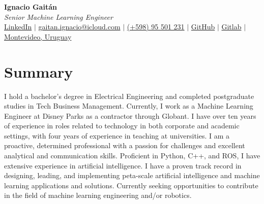 \documentclass[letterpaper,11pt]{article}
\begin{document}
\begin{center}
    \textbf{\LARGE Ignacio Gaitán} \\ \vspace{2ex}
    \textit{Senior Machine Learning Engineer} \\ \vspace{2ex}
    \small
    \faLinkedinSquare \hspace{.5pt} \href{https://www.linkedin.com/in/ignacio-gaitan}{LinkedIn}
    $|$
    \faAt \hspace{.5pt} \href{mailto:gaitan.ignacio@icloud.com}{gaitan.ignacio@icloud.com}
    $|$
    \faMobile \hspace{.5pt} \href{tel:+59895501231}{(+598) 95 501 231}
    $|$
    \faGithub \hspace{.5pt} \href{https://github.com/gaitanignacio}{GitHub}
    $|$
    \faGithub \hspace{.5pt} \href{https://gitlab.com/gaitan.ignacio}{Gitlab}
    $|$
    \faMapMarker \hspace{.5pt} \href{https://www.google.com/maps/place/Prof.+Juan+Carlos+Sabat+Pebet+1234,+11300+Montevideo,+Departamento+de+Montevideo,+Uruguay/@-34.9044985,-56.1366609,17z/data=!3m1!4b1!4m6!3m5!1s0x959f813e56b3cedd:0x5a415e79543b2770!8m2!3d-34.9044985!4d-56.134086!16s%2Fg%2F11pysbccyt?entry=ttu}{Montevideo, Uruguay}
\end{center}

\vspace{-2ex}

\section*{Summary}
I hold a bachelor's degree in Electrical Engineering and completed postgraduate studies in Tech Business Management. Currently, I work as a Machine Learning Engineer at Disney Parks as a contractor through Globant. I have over ten years of experience in roles related to technology in both corporate and academic settings, with four years of experience in teaching at universities. I am a proactive, determined professional with a passion for challenges and excellent analytical and communication skills. Proficient in Python, C++, and ROS, I have extensive experience in artificial intelligence. I have a proven track record in designing, leading, and implementing peta-scale artificial intelligence and machine learning applications and solutions. Currently seeking opportunities to contribute in the field of machine learning engineering and/or robotics.
\end{document}
